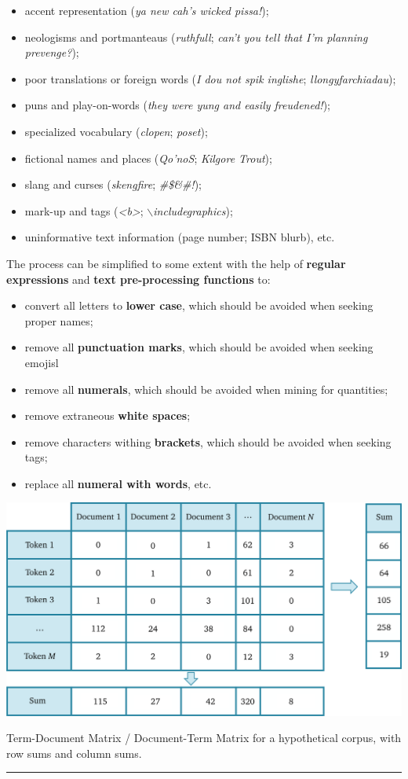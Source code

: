 \begin{itemize}[noitemsep]
\item accent representation (\textit{ya new cah's wicked pissa!});
\item neologisms and portmanteaus (\textit{ruthfull}; \textit{can't you tell that I'm planning prevenge?});
\item poor translations or foreign words (\textit{I dou not spik inglishe}; \textit{llongyfarchiadau});
\item puns and play-on-words (\textit{they were yung and easily freudened!});
\item specialized vocabulary (\textit{clopen}; \textit{poset}); 
\item fictional names and places (\textit{Qo'noS}; \textit{Kilgore Trout});
\item slang and curses (\textit{skengfire}; \textit{\#\$\&\#!});
\item mark-up and tags (\textit{<b>}; \textit{{$\backslash$}includegraphics});
\item uninformative text information (page number; ISBN blurb), etc. 
\end{itemize} 
The process can be simplified to some extent with the help of \textbf{regular expressions} and \textbf{text pre-processing functions} to: \begin{itemize}[noitemsep]
\item convert all letters to \textbf{lower case}, which should be avoided when seeking proper names;
\item remove all \textbf{punctuation marks}, which should be avoided when seeking emojisl
\item remove all \textbf{numerals}, which should be avoided when mining for quantities; 
\item remove extraneous \textbf{white spaces};
\item remove characters withing \textbf{brackets}, which should be avoided when seeking tags;
\item replace all \textbf{numeral with words}, etc. 
\end{itemize}
\begin{table}[!t]
\centering
\includegraphics[width=\textwidth]{images/DSML/TDM.png}
\caption[\small TDM/DTM for a hypothetical corpus]{\small Term-Document Matrix / Document-Term Matrix for a hypothetical corpus, with row sums and column sums.}\hrule\label{fig:TDM}
\end{table}
